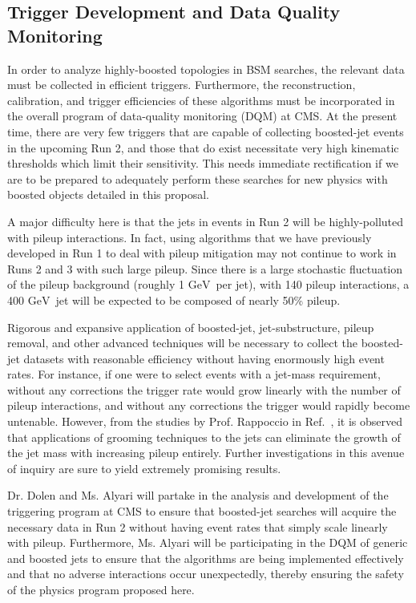 \documentclass[12pt]{proposalnsf}
\newcommand{\GeVc}{\ensuremath{\mathrm{GeV}}}
\begin{document}
\subsection{Trigger Development and Data Quality Monitoring}

In order to analyze highly-boosted topologies in BSM searches, 
the relevant data must be collected in efficient triggers. Furthermore, the
reconstruction, calibration, and trigger efficiencies of these
algorithms must be incorporated in the overall program of 
data-quality monitoring (DQM) at CMS. At the present time, there are
very few triggers that are capable of collecting boosted-jet
events in the upcoming Run 2, and those that do exist necessitate very
high kinematic thresholds which limit their sensitivity. This needs
immediate rectification if we are to be prepared to adequately perform
these searches for new physics with boosted objects detailed in this
proposal. 

A major difficulty here is that the jets in events in
Run 2 will be highly-polluted with pileup interactions. 
In fact, using algorithms that we have previously developed in Run 1
to deal with pileup mitigation may not continue to work in Runs 2 and
3 with
such large pileup. Since there is a large stochastic fluctuation of
the pileup background (roughly 1 \GeVc\ per jet), with 140 pileup
interactions, a 400 \GeVc\ jet will be expected to be composed of
nearly 50\% pileup. 

Rigorous and
expansive application of boosted-jet, jet-substructure, pileup
removal, and other advanced techniques
will be necessary to collect the boosted-jet datasets with reasonable
efficiency without having enormously high event rates. For instance,
if one were to select events with a jet-mass requirement, without any
corrections the trigger rate would grow linearly with the number of
pileup interactions, and without any corrections the trigger would
rapidly become untenable. However, from the studies by Prof. Rappoccio in
Ref.~\cite{SMP-12-019}, it is observed that applications of grooming
techniques to the jets can eliminate the growth of the jet mass with
increasing pileup entirely. Further investigations in this avenue of
inquiry are sure to yield extremely promising results. 


Dr. Dolen and Ms. Alyari will partake in the analysis and development
of the triggering program at CMS to ensure that boosted-jet searches
will acquire the necessary data in Run 2 without having event rates
that simply scale linearly with pileup. 
Furthermore, Ms. Alyari will be participating in the DQM of generic
and boosted jets to ensure that the algorithms are being implemented
effectively and that no adverse interactions occur unexpectedly,
thereby ensuring the safety of the physics program proposed here. 
\end{document}
